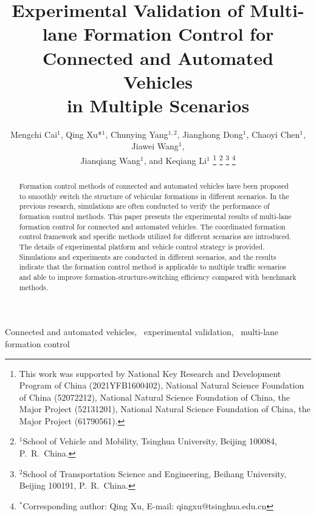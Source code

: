 \documentclass[journal]{IEEEtranTIE}
\begin{document}
\title{Experimental Validation of Multi-lane Formation Control for Connected and Automated Vehicles\\ in Multiple Scenarios}


\author{Mengchi Cai$^{1}$, Qing Xu*$^{1}$, Chunying Yang$^{1, 2}$, Jianghong Dong$^{1}$, Chaoyi Chen$^{1}$, Jiawei Wang$^{1}$, \\Jianqiang Wang$^{1}$, and Keqiang Li$^{1}$
\thanks{This work was supported by National Key Research and Development Program of China (2021YFB1600402), National Natural Science Foundation of China (52072212), National Natural Science Foundation of China, the Major Project (52131201), National Natural Science Foundation of China, the Major Project (61790561).}
\thanks{$^{1}$School of Vehicle and Mobility, Tsinghua University, Beijing 100084, P.~R.~China.}
\thanks{$^{2}$School of Transportation Science and Engineering, Beihang University, Beijing 100191, P.~R.~China.}
\thanks{$^{*}$Corresponding author: Qing Xu, E-mail: qingxu@tsinghua.edu.cn}
}




\maketitle


\begin{abstract}

Formation control methods of connected and automated vehicles have been proposed to smoothly switch the structure of vehicular formations in different scenarios. In the previous research, simulations are often conducted to verify the performance of formation control methods. This paper presents the experimental results of multi-lane formation control for connected and automated vehicles. The coordinated formation control framework and specific methods utilized for different scenarios are introduced. The details of experimental platform and vehicle control strategy is provided. Simulations and experiments are conducted in different scenarios, and the results indicate that the formation control method is applicable to multiple traffic scenarios and able to improve formation-structure-switching efficiency compared with benchmark methods.



\end{abstract}


\begin{IEEEkeywords}
Connected and automated vehicles, \ experimental validation, \ multi-lane formation control
\end{IEEEkeywords}
\end{document}
